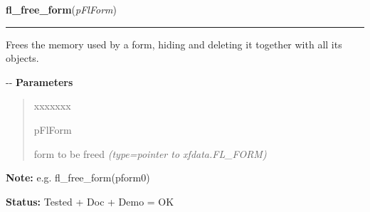 \hspace{.8\funcindent}\begin{boxedminipage}{\funcwidth}

    \raggedright \textbf{fl\_free\_form}(\textit{pFlForm})

    \vspace{-1.5ex}

    \rule{\textwidth}{0.5\fboxrule}
\setlength{\parskip}{2ex}

Frees the memory used by a form, hiding and deleting it together
with all its objects.

-{}-
\setlength{\parskip}{1ex}
      \textbf{Parameters}
      \vspace{-1ex}

      \begin{quote}
        \begin{Ventry}{xxxxxxx}

          \item[pFlForm]


form to be freed
            {\it (type=pointer to xfdata.FL\_FORM)}

        \end{Ventry}

      \end{quote}

\textbf{Note:} 
e.g. fl\_free\_form(pform0)


\textbf{Status:} 
Tested + Doc + Demo = OK


    \end{boxedminipage}

    \label{xformslib:flbasic:fl_redraw_form}

    \vspace{0.5ex}


